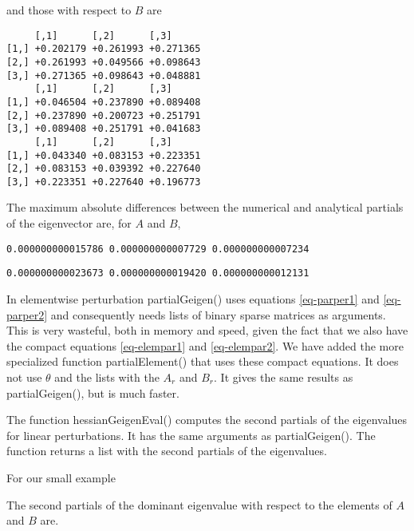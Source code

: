 \documentclass[
  12pt,
  letterpaper,
  DIV=11,
  numbers=noendperiod]{scrartcl}
\begin{document}
and those with respect to \(B\) are

\begin{verbatim}
     [,1]      [,2]      [,3]     
[1,] +0.202179 +0.261993 +0.271365
[2,] +0.261993 +0.049566 +0.098643
[3,] +0.271365 +0.098643 +0.048881
     [,1]      [,2]      [,3]     
[1,] +0.046504 +0.237890 +0.089408
[2,] +0.237890 +0.200723 +0.251791
[3,] +0.089408 +0.251791 +0.041683
     [,1]      [,2]      [,3]     
[1,] +0.043340 +0.083153 +0.223351
[2,] +0.083153 +0.039392 +0.227640
[3,] +0.223351 +0.227640 +0.196773
\end{verbatim}

The maximum absolute differences between the numerical and analytical
partials of the eigenvector are, for \(A\) and \(B\),

\begin{verbatim}
0.000000000015786 0.000000000007729 0.000000000007234 
\end{verbatim}

\begin{verbatim}
0.000000000023673 0.000000000019420 0.000000000012131 
\end{verbatim}

In elementwise perturbation partialGeigen() uses equations
\eqref{eq-parper1} and \eqref{eq-parper2} and consequently needs lists
of binary sparse matrices as arguments. This is very wasteful, both in
memory and speed, given the fact that we also have the compact equations
\eqref{eq-elempar1} and \eqref{eq-elempar2}. We have added the more
specialized function partialElement() that uses these compact equations.
It does not use \(\theta\) and the lists with the \(A_r\) and \(B_r\).
It gives the same results as partialGeigen(), but is much faster.

The function hessianGeigenEval() computes the second partials of the
eigenvalues for linear perturbations. It has the same arguments as
partialGeigen(). The function returns a list with the second partials of
the eigenvalues.

For our small example

The second partials of the dominant eigenvalue with respect to the
elements of \(A\) and \(B\) are.
\end{document}
